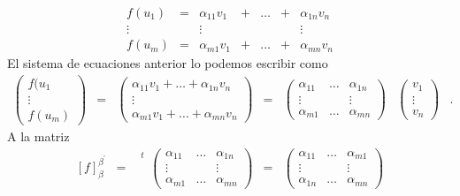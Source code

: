  		\[ 
 		\begin{array}{ccccccc}
 		f(u_{1}) & = & \alpha_{11} v_{1} & + & \ldots & + & \alpha_{1n} v_{n} 
 		\\
 		\vdots &     & \vdots &               &      &              &      \vdots 
 		\\
 		f(u_{m}) & = & \alpha_{m1} v_{1} & + & \ldots & + & \alpha_{mn} v_{n}
 		\end{array}
 		 \]
 		 El sistema de ecuaciones anterior lo podemos escribir como 
 		 \[
 		 		\begin{array}{ccccccc}
 		 		\left( \begin{array}{c}
 		 		f(u_{1} \\ \vdots \\ f(u_{m})
 		 		\end{array} \right) 
 		 		& = &
 		 		\left( 
 		 		\begin{array}{c}
 		 	\alpha_{11} v_{1}+  \ldots + \alpha_{1n} v_{n}\\ \vdots \\ \alpha_{m1} v_{1}+  \ldots + \alpha_{mn} v_{n}
 		 		\end{array} 
 		 		\right)
 		 		& = &
 		 		\left(
 		 		\begin{array}{ccc}
 		 			\alpha_{11} &\ldots& \alpha_{1n} \\ \vdots & & \vdots \\ \alpha_{m1} &\ldots& \alpha_{mn}
 		 		\end{array}
 		 		\right)
 		 		&
 		 		\left(
 		 		\begin{array}{c}
 		 			v_{1} \\ \vdots \\ v_{n}
 		 		\end{array}
 		 		\right)
 		 		&.
 		 		\end{array}
 		 \]
 		 A la matriz 
 		 \[ 
 		 \begin{array}{cccccc}
 		 [f]^{\beta^{'}}_{\beta} &=&\begin{array}{ccc}
 		 ^{t}\\ \\ \\ \\
 		 \end{array}\left( \begin{array}{cccc}
 		 \alpha_{11} &\ldots& \alpha_{1n} \\ \vdots & & \vdots \\ \alpha_{m1} &\ldots& \alpha_{mn}
 		 \end{array}\right) 
 		 & = & \left( \begin{array}{ccc}
 		 \alpha_{11} &\ldots& \alpha_{m1} \\ \vdots & & \vdots \\ \alpha_{1n} &\ldots& \alpha_{mn}
 		 \end{array}\right) 
 		 \end{array}
 		  \]
 		  
